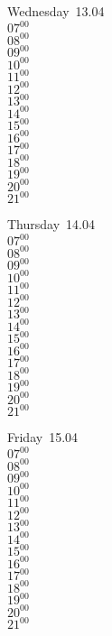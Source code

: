 \documentclass[11pt,a4paper]{book}\usepackage[]{graphicx}\usepackage[]{color}
\begin{document}
\begin{weekdaybox}
  Wednesday~13.04\\
  { 
  \vfill
  $07^{00}$\\
$08^{00}$\\
$09^{00}$\\
$10^{00}$\\
$11^{00}$\\
$12^{00}$\\
$13^{00}$\\
$14^{00}$\\
$15^{00}$\\
$16^{00}$\\
$17^{00}$\\
$18^{00}$\\
$19^{00}$\\
$20^{00}$\\
$21^{00}$\\
  }
\end{weekdaybox}
\clearpage
\begin{headerbox}
\end{headerbox}
\begin{weekdaybox}
  Thursday~14.04\\
  { 
  \vfill
  $07^{00}$\\
$08^{00}$\\
$09^{00}$\\
$10^{00}$\\
$11^{00}$\\
$12^{00}$\\
$13^{00}$\\
$14^{00}$\\
$15^{00}$\\
$16^{00}$\\
$17^{00}$\\
$18^{00}$\\
$19^{00}$\\
$20^{00}$\\
$21^{00}$\\
  }
\end{weekdaybox} 
\begin{weekdaybox}
  Friday~15.04\\
  { 
  \vfill
  $07^{00}$\\
$08^{00}$\\
$09^{00}$\\
$10^{00}$\\
$11^{00}$\\
$12^{00}$\\
$13^{00}$\\
$14^{00}$\\
$15^{00}$\\
$16^{00}$\\
$17^{00}$\\
$18^{00}$\\
$19^{00}$\\
$20^{00}$\\
$21^{00}$\\
  }
\end{weekdaybox}
\end{document}
